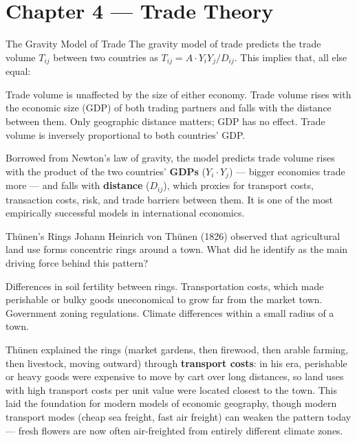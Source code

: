 \section{Chapter 4 — Trade Theory}

\begin{question}[type=mc]{The Gravity Model of Trade}
The gravity model of trade predicts the trade volume $T_{ij}$ between two
countries as $T_{ij} = A \cdot Y_i Y_j / D_{ij}$. This implies that, all else
equal:
\begin{choices}
  \choice        Trade volume is unaffected by the size of either economy.
  \correctchoice Trade volume rises with the economic size (GDP) of both
                 trading partners and falls with the distance between them.
  \choice        Only geographic distance matters; GDP has no effect.
  \choice        Trade volume is inversely proportional to both countries'
                 GDP.
  
\end{choices}
\begin{solution}
  Borrowed from Newton's law of gravity, the model predicts trade volume
  rises with the product of the two countries' \textbf{GDPs} ($Y_i \cdot
  Y_j$) --- bigger economies trade more --- and falls with \textbf{distance}
  ($D_{ij}$), which proxies for transport costs, transaction costs, risk,
  and trade barriers between them. It is one of the most empirically
  successful models in international economics.
\end{solution}
\end{question}

\begin{question}[type=mc]{Thünen's Rings}
Johann Heinrich von Thünen (1826) observed that agricultural land use forms
concentric rings around a town. What did he identify as the main driving
force behind this pattern?
\begin{choices}
  \choice        Differences in soil fertility between rings.
  \correctchoice Transportation costs, which made perishable or bulky goods
                 uneconomical to grow far from the market town.
  \choice        Government zoning regulations.
  \choice        Climate differences within a small radius of a town.
\end{choices}
\begin{solution}
  Thünen explained the rings (market gardens, then firewood, then arable
  farming, then livestock, moving outward) through \textbf{transport costs}:
  in his era, perishable or heavy goods were expensive to move by cart over
  long distances, so land uses with high transport costs per unit value were
  located closest to the town. This laid the foundation for modern models of
  economic geography, though modern transport modes (cheap sea freight, fast
  air freight) can weaken the pattern today --- fresh flowers are now often
  air-freighted from entirely different climate zones.
\end{solution}
\end{question}


